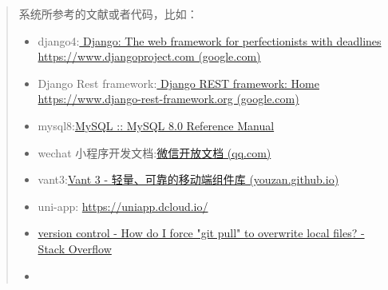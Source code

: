 \documentclass[
]{article}
\begin{document}
\begin{quote}
系统所参考的文献或者代码，比如：

\begin{itemize}
\item
  django4:\href{https://www.google.com/url?sa=t\&rct=j\&q=\&esrc=s\&source=web\&cd=\&cad=rja\&uact=8\&ved=2ahUKEwiYp9yJ2__3AhW6qVYBHS0TCZgQFnoECBUQAQ\&url=https\%3A\%2F\%2Fwww.djangoproject.com\%2F\&usg=AOvVaw3E6qaJashVeeIx3oahQxD7}{
  Django: The web framework for perfectionists with deadlines
  https://www.djangoproject.com (google.com)}
\item
  Django Rest
  framework:\href{https://www.google.com/url?sa=t\&rct=j\&q=\&esrc=s\&source=web\&cd=\&cad=rja\&uact=8\&ved=2ahUKEwi7qJ-Y2__3AhUepVYBHbjiAPEQFnoECAcQAQ\&url=https\%3A\%2F\%2Fwww.django-rest-framework.org\%2F\&usg=AOvVaw0ZGmLSXHw1XKCvqteVn5f-}{
  Django REST framework: Home https://www.django-rest-framework.org
  (google.com)}
\item
  mysql8:\href{https://dev.mysql.com/doc/refman/8.0/en/}{MySQL :: MySQL
  8.0 Reference Manual}
\item
  wechat
  小程序开发文档:\href{https://developers.weixin.qq.com/miniprogram/dev/framework/}{微信开放文档
  (qq.com)}
\item
  vant3:\href{https://youzan.github.io/vant/\#/zh-CN}{Vant 3 -
  轻量、可靠的移动端组件库 (youzan.github.io)}
\item
  uni-app: \url{https://uniapp.dcloud.io/}
\item
  \href{https://stackoverflow.com/questions/1125968/how-do-i-force-git-pull-to-overwrite-local-files}{version
  control - How do I force "git pull" to overwrite local files? - Stack
  Overflow}
\item
\end{itemize}
\end{quote}
\end{document}
